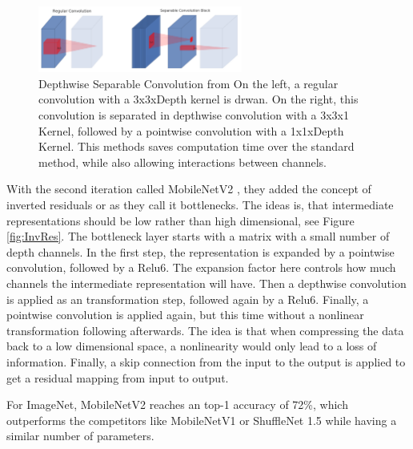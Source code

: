 \begin{figure}[H]
    \centering
    \includegraphics[width=0.6\textwidth]{images/Depthwise_Separable_Convolution.png}
    \caption{Depthwise Separable Convolution from \cite[Page 3]{sandler2018mobilenetv2} \newline On the left,
     a regular convolution with a 3x3xDepth kernel is drwan. On the right, this
     convolution is separated in depthwise convolution with a 3x3x1 Kernel,
     followed by a pointwise convolution with a 1x1xDepth Kernel. This methods
     saves computation time over the standard method, while also allowing
     interactions between channels.}
     \label{fig:DSConv}
\end{figure}


With the second iteration called MobileNetV2 \cite{sandler2018mobilenetv2}, they
added the concept of inverted residuals or as they call it bottlenecks. The
ideas is, that intermediate representations should be low rather than high
dimensional, see Figure \ref{fig:InvRes}. The bottleneck layer starts with a matrix with a
small number of depth channels. In the first step, the representation is
expanded by a pointwise convolution, followed by a Relu6. The expansion factor
here controls how much channels the intermediate representation will have. Then
a depthwise convolution is applied as an transformation step, followed again by
a Relu6. Finally, a pointwise convolution is applied again, but this time
without a nonlinear transformation following afterwards. The idea is that when
compressing the data back to a low dimensional space, a nonlinearity would only
lead to a loss of information. Finally, a skip connection from the input to the
output is applied to get a residual mapping from input to output.

For ImageNet, MobileNetV2 reaches an top-1 accuracy of 72\%, which outperforms
the competitors like MobileNetV1 or ShuffleNet 1.5 while having a similar number
of parameters.


